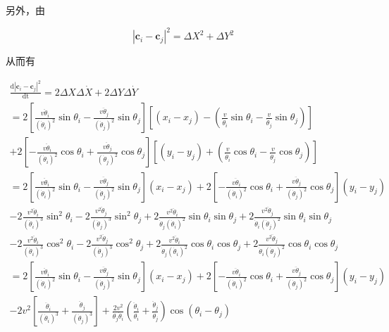 \documentclass{article}
\begin{document}
另外，由

$$
\left| \mathbf{c}_i-\mathbf{c}_j \right|^2=\Delta X^2+\Delta Y^2
$$

从而有

\begin{equation}\label{eq:distanceCenterSquare}
    \begin{array}{l}
        \frac{\mathrm{d}\left| \mathbf{c}_i-\mathbf{c}_j \right|^2}{\mathrm{dt}}=2\Delta X\Delta \dot{X}+2\Delta Y\Delta \dot{Y}\\
        =2\left[ \frac{v\ddot{\theta}_i}{\left( \dot{\theta}_i \right) ^2}\sin \theta _i-\frac{v\ddot{\theta}_j}{\left( \dot{\theta}_j \right) ^2}\sin \theta _j \right] \left[ \left( x_i-x_j \right) -\left( \frac{v}{\dot{\theta}_i}\sin \theta _i-\frac{v}{\dot{\theta}_j}\sin \theta _j \right) \right]\\
        +2\left[ -\frac{v\ddot{\theta}_i}{\left( \dot{\theta}_i \right) ^2}\cos \theta _i+\frac{v\ddot{\theta}_j}{\left( \dot{\theta}_j \right) ^2}\cos \theta _j \right] \left[ \left( y_i-y_j \right) +\left( \frac{v}{\dot{\theta}_i}\cos \theta _i-\frac{v}{\dot{\theta}_j}\cos \theta _j \right) \right]\\
        =2\left[ \frac{v\ddot{\theta}_i}{\left( \dot{\theta}_i \right) ^2}\sin \theta _i-\frac{v\ddot{\theta}_j}{\left( \dot{\theta}_j \right) ^2}\sin \theta _j \right] \left( x_i-x_j \right) +2\left[ -\frac{v\ddot{\theta}_i}{\left( \dot{\theta}_i \right) ^2}\cos \theta _i+\frac{v\ddot{\theta}_j}{\left( \dot{\theta}_j \right) ^2}\cos \theta _j \right] \left( y_i-y_j \right)\\
        -2\frac{v^2\ddot{\theta}_i}{\left( \dot{\theta}_i \right) ^3}\sin ^2\theta _i-2\frac{v^2\ddot{\theta}_j}{\left( \dot{\theta}_j \right) ^3}\sin ^2\theta _j+2\frac{v^2\ddot{\theta}_i}{\dot{\theta}_j\left( \dot{\theta}_i \right) ^2}\sin \theta _i\sin \theta _j+2\frac{v^2\ddot{\theta}_j}{\dot{\theta}_i\left( \dot{\theta}_j \right) ^2}\sin \theta _i\sin \theta _j\\
        -2\frac{v^2\ddot{\theta}_i}{\left( \dot{\theta}_i \right) ^3}\cos ^2\theta _i-2\frac{v^2\ddot{\theta}_j}{\left( \dot{\theta}_j \right) ^3}\cos ^2\theta _j+2\frac{v^2\ddot{\theta}_i}{\dot{\theta}_j\left( \dot{\theta}_i \right) ^2}\cos \theta _i\cos \theta _j+2\frac{v^2\ddot{\theta}_j}{\dot{\theta}_i\left( \dot{\theta}_j \right) ^2}\cos \theta _i\cos \theta _j\\
        =2\left[ \frac{v\ddot{\theta}_i}{\left( \dot{\theta}_i \right) ^2}\sin \theta _i-\frac{v\ddot{\theta}_j}{\left( \dot{\theta}_j \right) ^2}\sin \theta _j \right] \left( x_i-x_j \right) +2\left[ -\frac{v\ddot{\theta}_i}{\left( \dot{\theta}_i \right) ^2}\cos \theta _i+\frac{v\ddot{\theta}_j}{\left( \dot{\theta}_j \right) ^2}\cos \theta _j \right] \left( y_i-y_j \right)\\
        -2v^2\left[ \frac{\ddot{\theta}_i}{\left( \dot{\theta}_i \right) ^3}+\frac{\ddot{\theta}_j}{\left( \dot{\theta}_j \right) ^3} \right] +\frac{2v^2}{\dot{\theta}_j\dot{\theta}_i}\left( \frac{\ddot{\theta}_i}{\dot{\theta}_i}+\frac{\ddot{\theta}_j}{\dot{\theta}_j} \right) \cos \left( \theta _i-\theta _j \right)\\
    \end{array}
\end{equation}
\end{document}
